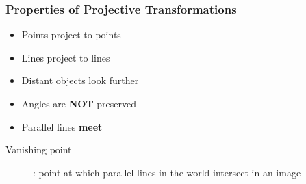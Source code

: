 \documentclass[letterpaper,12pt]{article}
\begin{document}
\subsubsection{Properties of Projective Transformations}
\begin{itemize}
 \item Points project to points
 \item Lines project to lines
 \item Distant objects look further
 \item Angles are \textbf{NOT} preserved
 \item Parallel lines \textbf{meet}
\end{itemize}
\begin{description}
 \item[Vanishing point]: point at which parallel lines in the world intersect in an image
\end{description}
\end{document}
